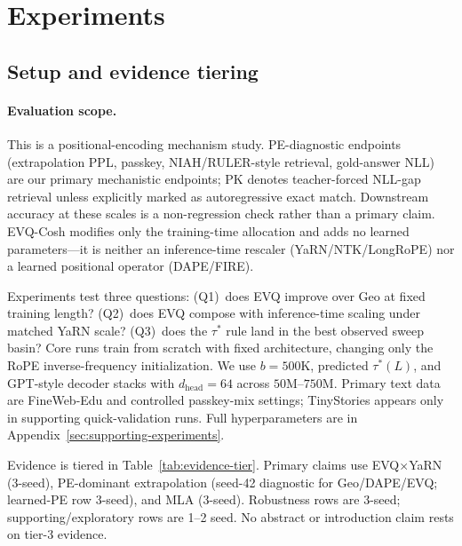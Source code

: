 \section{Experiments}
\label{sec:experiments}

\subsection{Setup and evidence tiering}
\label{sec:exp-setup}

\paragraph{Evaluation scope.} This is a positional-encoding mechanism study. PE-diagnostic endpoints (extrapolation PPL, passkey, NIAH/RULER-style retrieval, gold-answer NLL) are our primary mechanistic endpoints; PK denotes teacher-forced NLL-gap retrieval unless explicitly marked as autoregressive exact match. Downstream accuracy at these scales is a non-regression check rather than a primary claim. EVQ-Cosh modifies only the training-time allocation and adds no learned parameters---it is neither an inference-time rescaler (YaRN/NTK/LongRoPE) nor a learned positional operator (DAPE/FIRE).

Experiments test three questions: (Q1)~does EVQ improve over Geo at fixed training length? (Q2)~does EVQ compose with inference-time scaling under matched YaRN scale? (Q3)~does the $\tau^*$ rule land in the best observed sweep basin? Core runs train from scratch with fixed architecture, changing only the RoPE inverse-frequency initialization. We use $b{=}500\mathrm{K}$, predicted $\tau^*(L)$, and GPT-style decoder stacks \citep{radford2019gpt2} with $d_{\mathrm{head}}{=}64$ across $50$M--$750$M. Primary text data are FineWeb-Edu \citep{penedo2024fineweb} and controlled passkey-mix settings; TinyStories \citep{eldan2023tinystories} appears only in supporting quick-validation runs. Full hyperparameters are in Appendix~\ref{sec:supporting-experiments}.

Evidence is tiered in Table~\ref{tab:evidence-tier}. Primary claims use EVQ$\times$YaRN (3-seed), PE-dominant extrapolation (seed-42 diagnostic for Geo/DAPE/EVQ; learned-PE row 3-seed), and MLA (3-seed). Robustness rows are 3-seed; supporting/exploratory rows are 1--2 seed. No abstract or introduction claim rests on tier-3 evidence.


\FloatBarrier

